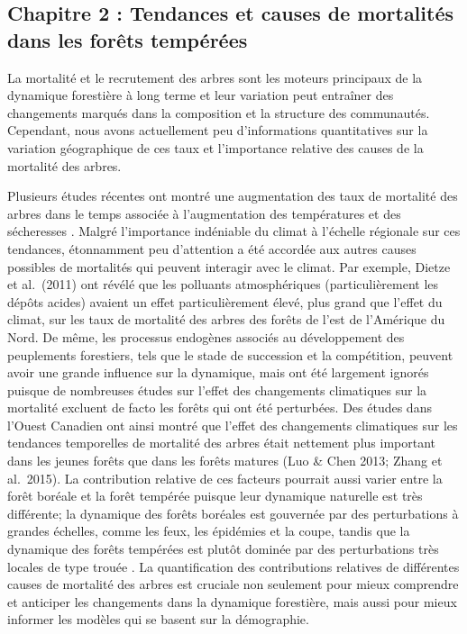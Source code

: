 \hypertarget{chapitre-2-tendances-et-causes-de-mortalituxe9s-dans-les-foruxeats-tempuxe9ruxe9es}{%
\subsection{Chapitre 2 : Tendances et causes de mortalités dans les
forêts
tempérées}\label{chapitre-2-tendances-et-causes-de-mortalituxe9s-dans-les-foruxeats-tempuxe9ruxe9es}}

La mortalité et le recrutement des arbres sont les moteurs principaux de
la dynamique forestière à long terme et leur variation peut entraîner
des changements marqués dans la composition et la structure des
communautés. Cependant, nous avons actuellement peu d'informations
quantitatives sur la variation géographique de ces taux et l'importance
relative des causes de la mortalité des arbres.

Plusieurs études récentes ont montré une augmentation des taux de
mortalité des arbres dans le temps associée à l'augmentation des
températures et des sécheresses
\citep{van_mantgem_apparent_2007, van_mantgem_widespread_2009, allen_global_2010, peng_drought-induced_2011}.
Malgré l'importance indéniable du climat à l'échelle régionale sur ces
tendances, étonnamment peu d'attention a été accordée aux autres causes
possibles de mortalités qui peuvent interagir avec le climat. Par
exemple, Dietze et al.~(2011) ont révélé que les polluants
atmosphériques (particulièrement les dépôts acides) avaient un effet
particulièrement élevé, plus grand que l'effet du climat, sur les taux
de mortalité des arbres des forêts de l'est de l'Amérique du Nord. De
même, les processus endogènes associés au développement des peuplements
forestiers, tels que le stade de succession et la compétition, peuvent
avoir une grande influence sur la dynamique, mais ont été largement
ignorés puisque de nombreuses études sur l'effet des changements
climatiques sur la mortalité excluent de facto les forêts qui ont été
perturbées. Des études dans l'Ouest Canadien ont ainsi montré que
l'effet des changements climatiques sur les tendances temporelles de
mortalité des arbres était nettement plus important dans les jeunes
forêts que dans les forêts matures (Luo \& Chen 2013; Zhang et
al.~2015). La contribution relative de ces facteurs pourrait aussi
varier entre la forêt boréale et la forêt tempérée puisque leur
dynamique naturelle est très différente; la dynamique des forêts
boréales est gouvernée par des perturbations à grandes échelles, comme
les feux, les épidémies et la coupe, tandis que la dynamique des forêts
tempérées est plutôt dominée par des perturbations très locales de type
trouée \citep{goldblum_deciduous_2010}. La quantification des
contributions relatives de différentes causes de mortalité des arbres
est cruciale non seulement pour mieux comprendre et anticiper les
changements dans la dynamique forestière, mais aussi pour mieux informer
les modèles qui se basent sur la démographie.

